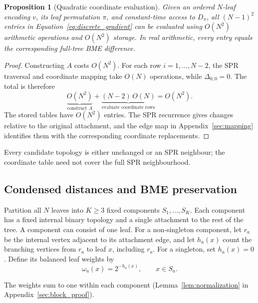 \documentclass[11pt,a4paper]{article}
\makeatletter
\DeclareRobustCommand{\_}{\ifmmode\nfss@text{\textunderscore}\else\textunderscore\allowbreak\fi}
\newtheorem{proposition}[theorem]{Proposition}
\theoremstyle{definition}
\makeatother
\begin{document}
\begin{proposition}[Quadratic coordinate evaluation]
\label{prop:quadratic}
Given an ordered $N$-leaf encoding $v$, its leaf permutation $\pi$, and constant-time access to $D_\pi$, all $(N-1)^2$ entries in Equation~\eqref{eq:discrete_gradient} can be evaluated using $O(N^2)$ arithmetic operations and $O(N^2)$ storage.
In real arithmetic, every entry equals the corresponding full-tree BME difference.
\end{proposition}
\begin{proof}
Constructing $A$ costs $O(N^2)$.
For each row $i=1,\ldots,N-2$, the SPR traversal and coordinate mapping take $O(N)$ operations, while $\Delta_{0,0}=0$.
The total is therefore
\[
 \underbrace{O(N^2)}_{\text{construct }A}
 +\underbrace{(N-2)\,O(N)}_{\text{evaluate coordinate rows}}
 =O(N^2).
\]
The stored tables have $O(N^2)$ entries.
The SPR recurrence gives changes relative to the original attachment, and the edge map in Appendix~\ref{sec:mapping} identifies them with the corresponding coordinate replacements.
\end{proof}

Every candidate topology is either unchanged or an SPR neighbour; the coordinate table need not cover the full SPR neighbourhood.

\subsection{Condensed distances and BME preservation}
\label{sec:condensation}

Partition all $N$ leaves into $K\geq3$ fixed components $S_1,\ldots,S_K$.
Each component has a fixed internal binary topology and a single attachment to the rest of the tree.
A component can consist of one leaf.
For a non-singleton component, let $r_a$ be the internal vertex adjacent to its attachment edge, and let $h_a(x)$ count the branching vertices from $r_a$ to leaf $x$, including $r_a$.
For a singleton, set $h_a(x)=0$.
Define its balanced leaf weights by
\begin{equation}
 \omega_a(x)=2^{-h_a(x)},\qquad x\in S_a.
 \label{eq:profile}
\end{equation}

The weights sum to one within each component (Lemma~\ref{lem:normalization} in Appendix~\ref{sec:block_proof}).
\end{document}
